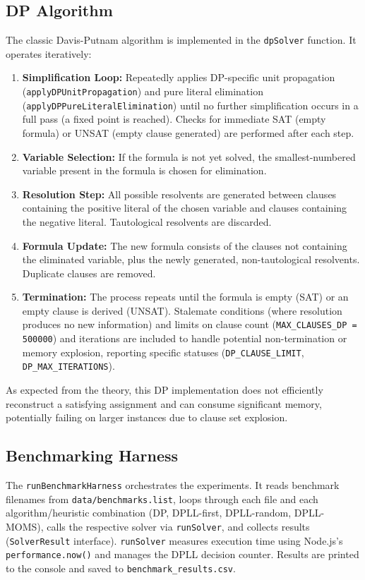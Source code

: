 \documentclass[12pt, a4paper]{article}
\begin{document}
\subsection{DP Algorithm}
The classic Davis-Putnam algorithm is implemented in the \texttt{dpSolver} function. It operates iteratively:
\begin{enumerate}
    \item \textbf{Simplification Loop:} Repeatedly applies DP-specific unit propagation (\texttt{applyDPUnitPropagation}) and pure literal elimination (\texttt{applyDPPureLiteralElimination}) until no further simplification occurs in a full pass (a fixed point is reached). Checks for immediate SAT (empty formula) or UNSAT (empty clause generated) are performed after each step.
    \item \textbf{Variable Selection:} If the formula is not yet solved, the smallest-numbered variable present in the formula is chosen for elimination.
    \item \textbf{Resolution Step:} All possible resolvents are generated between clauses containing the positive literal of the chosen variable and clauses containing the negative literal. Tautological resolvents are discarded.
    \item \textbf{Formula Update:} The new formula consists of the clauses not containing the eliminated variable, plus the newly generated, non-tautological resolvents. Duplicate clauses are removed.
    \item \textbf{Termination:} The process repeats until the formula is empty (SAT) or an empty clause is derived (UNSAT). Stalemate conditions (where resolution produces no new information) and limits on clause count (\texttt{MAX\_CLAUSES\_DP = 500000}) and iterations are included to handle potential non-termination or memory explosion, reporting specific statuses (\texttt{DP\_CLAUSE\_LIMIT}, \texttt{DP\_MAX\_ITERATIONS}).
\end{enumerate}
As expected from the theory, this DP implementation does not efficiently reconstruct a satisfying assignment and can consume significant memory, potentially failing on larger instances due to clause set explosion.

\subsection{Benchmarking Harness}
The \texttt{runBenchmarkHarness} orchestrates the experiments. It reads benchmark filenames from \texttt{data/benchmarks.list}, loops through each file and each algorithm/heuristic combination (DP, DPLL-first, DPLL-random, DPLL-MOMS), calls the respective solver via \texttt{runSolver}, and collects results (\texttt{SolverResult} interface). \texttt{runSolver} measures execution time using Node.js's \texttt{performance.now()} and manages the DPLL decision counter. Results are printed to the console and saved to \texttt{benchmark\_results.csv}.
\end{document}
